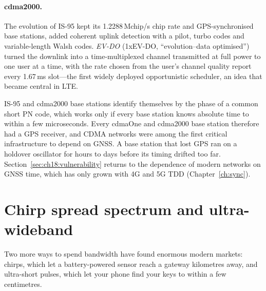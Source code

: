 \paragraph{cdma2000.} The evolution of IS-95 kept its 1.2288\,Mchip/s chip rate and
GPS-synchronised base stations, added coherent uplink detection with a pilot, turbo codes and
variable-length Walsh codes. \emph{EV-DO} (1xEV-DO, ``evolution--data optimised'') turned the
downlink into a time-multiplexed channel transmitted at full power to one user at a time,
with the rate chosen from the user's channel quality report every 1.67\,ms slot---the first
widely deployed opportunistic scheduler, an idea that became central in LTE.

\begin{pitfall}
IS-95 and cdma2000 base stations identify themselves by the phase of a common short PN
code, which works only if every base station knows absolute time to within a few
microseconds. Every cdmaOne and cdma2000 base station therefore had a GPS receiver, and
CDMA networks were among the first critical infrastructure to depend on GNSS. A base station
that lost GPS ran on a holdover oscillator for hours to days before its timing drifted
too far. Section~\ref{sec:ch18:vulnerability} returns to the dependence of modern networks on
GNSS time, which has only grown with 4G and 5G TDD (Chapter~\ref{ch:sync}).
\end{pitfall}

\section{Chirp spread spectrum and ultra-wideband}
\label{sec:ch18:css}

Two more ways to spend bandwidth have found enormous modern markets: chirps, which let a
battery-powered sensor reach a gateway kilometres away, and ultra-short pulses, which let your
phone find your keys to within a few centimetres.


